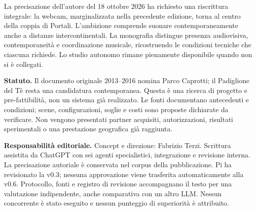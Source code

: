 \documentclass[11pt,a4paper,oneside]{report}
\begin{document}
La precisazione dell'autore del 18 ottobre 2026 ha richiesto una riscrittura integrale: la webcam, marginalizzata nella precedente edizione, torna al centro della coppia di Portali. L'ambizione comprende suonare contemporaneamente anche a distanze intercontinentali. La monografia distingue presenza audiovisiva, contemporaneità e coordinazione musicale, ricostruendo le condizioni tecniche che ciascuna richiede. Lo studio autonomo rimane pienamente disponibile quando non si è collegati.

\textbf{Statuto.} Il documento originale 2013--2016 nomina Parco Caprotti; il Padiglione del Tè resta una candidatura contemporanea. Questa è una ricerca di progetto e pre-fattibilità, non un sistema già realizzato. Le fonti documentano antecedenti e condizioni; scene, configurazioni, soglie e costi sono proposte dichiarate da verificare. Non vengono presentati partner acquisiti, autorizzazioni, risultati sperimentali o una prestazione geografica già raggiunta.

\textbf{Responsabilità editoriale.} Concept e direzione: Fabrizio Terzi. Scrittura assistita da ChatGPT con sei agenti specialistici, integrazione e revisione interna. La precisazione autoriale è conservata nel corpus della pubblicazione. Pi ha revisionato la v0.3; nessuna approvazione viene trasferita automaticamente alla v0.6. Protocollo, fonti e registro di revisione accompagnano il testo per una valutazione indipendente, anche comparativa con un altro LLM. Nessun concorrente è stato eseguito e nessun punteggio di superiorità è attribuito.

\tableofcontents
\clearpage{}








\appendix



\end{document}
